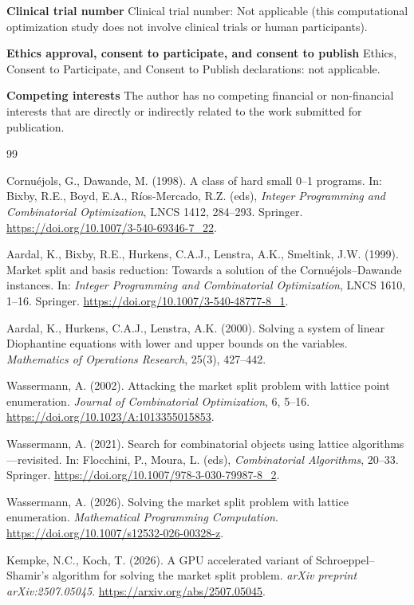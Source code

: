 \documentclass[11pt]{article}
\begin{document}
\textbf{Clinical trial number} Clinical trial number: Not applicable (this computational optimization study does not involve clinical trials or human participants).

\textbf{Ethics approval, consent to participate, and consent to publish} Ethics, Consent to Participate, and Consent to Publish declarations: not applicable.

\textbf{Competing interests} The author has no competing financial or non-financial interests that are directly or indirectly related to the work submitted for publication.

\begin{thebibliography}{99}

Cornu\'ejols, G., Dawande, M. (1998).
A class of hard small 0--1 programs.
In: Bixby, R.E., Boyd, E.A., R\'ios-Mercado, R.Z. (eds),
\emph{Integer Programming and Combinatorial Optimization}, LNCS 1412, 284--293.
Springer. \url{https://doi.org/10.1007/3-540-69346-7_22}.

Aardal, K., Bixby, R.E., Hurkens, C.A.J., Lenstra, A.K., Smeltink, J.W. (1999).
Market split and basis reduction: Towards a solution of the Cornu\'ejols--Dawande instances.
In: \emph{Integer Programming and Combinatorial Optimization}, LNCS 1610, 1--16.
Springer. \url{https://doi.org/10.1007/3-540-48777-8_1}.

Aardal, K., Hurkens, C.A.J., Lenstra, A.K. (2000).
Solving a system of linear Diophantine equations with lower and upper bounds on the variables.
\emph{Mathematics of Operations Research}, 25(3), 427--442.

Wassermann, A. (2002).
Attacking the market split problem with lattice point enumeration.
\emph{Journal of Combinatorial Optimization}, 6, 5--16.
\url{https://doi.org/10.1023/A:1013355015853}.

Wassermann, A. (2021).
Search for combinatorial objects using lattice algorithms---revisited.
In: Flocchini, P., Moura, L. (eds), \emph{Combinatorial Algorithms}, 20--33.
Springer. \url{https://doi.org/10.1007/978-3-030-79987-8_2}.

Wassermann, A. (2026).
Solving the market split problem with lattice enumeration.
\emph{Mathematical Programming Computation}.
\url{https://doi.org/10.1007/s12532-026-00328-z}.

Kempke, N.C., Koch, T. (2026).
A GPU accelerated variant of Schroeppel--Shamir's algorithm for solving the market split problem.
\emph{arXiv preprint arXiv:2507.05045}.
\url{https://arxiv.org/abs/2507.05045}.


\end{thebibliography}
\end{document}
